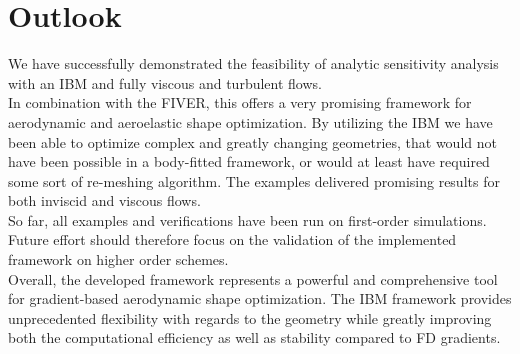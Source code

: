 \documentclass[../main.tex]{subfiles}
\begin{document}
\section{Outlook}\label{sec:outlook}
We have successfully demonstrated the feasibility of  analytic sensitivity analysis with an \acf{IBM} and fully viscous and turbulent flows.\\
In combination with the \acf{FIVER}, this offers a very promising framework for aerodynamic and aeroelastic shape optimization. By utilizing the \ac{IBM} we have been able to optimize complex and greatly changing geometries, that would not have been possible in a body-fitted framework, or would at least have required some sort of re-meshing algorithm. The examples delivered promising results for both inviscid and viscous flows.\\
So far, all examples and verifications have been run on first-order simulations. Future effort should therefore focus on the validation of the implemented framework on higher order schemes.\\
Overall, the developed framework represents a powerful and comprehensive tool for gradient-based aerodynamic shape optimization. The \ac{IBM} framework provides unprecedented flexibility with regards to the geometry while greatly improving both the computational efficiency as well as stability compared to \ac{FD} gradients.
\end{document}

